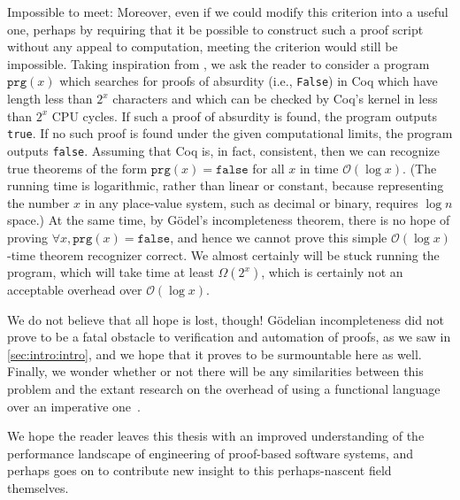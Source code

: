 Impossible to meet:
Moreover, even if we could modify this criterion into a useful one, perhaps by requiring that it be possible to construct such a proof script without any appeal to computation, meeting the criterion would still be impossible.
Taking inspiration from \textcite[pp.~24--25]{Logical2016Garrabrant}, we ask the reader to consider a program $\texttt{prg}(x)$ which searches for proofs of absurdity (i.e., \texttt{False}) in Coq which have length less than $2^x$ characters and which can be checked by Coq's kernel in less than $2^x$ CPU cycles.
If such a proof of absurdity is found, the program outputs \texttt{true}.
If no such proof is found under the given computational limits, the program outputs \texttt{false}.
Assuming that Coq is, in fact, consistent, then we can recognize true theorems of the form $\texttt{prg}(x) = \texttt{false}$ for all $x$ in time $\mathcal O(\log x)$.
(The running time is logarithmic, rather than linear or constant, because representing the number $x$ in any place-value system, such as decimal or binary, requires $\log n$ space.)
At the same time, by Gödel's incompleteness theorem, there is no hope of proving $\forall x, \texttt{prg}(x) = \texttt{false}$, and hence we cannot prove this simple $\mathcal O(\log x)$-time theorem recognizer correct.
We almost certainly will be stuck running the program, which will take time at least $\Omega(2^x)$, which is certainly not an acceptable overhead over $\mathcal O(\log x)$.

We do not believe that all hope is lost, though!
Gödelian incompleteness did not prove to be a fatal obstacle to verification and automation of proofs, as we saw in \autoref{sec:intro:intro}, and we hope that it proves to be surmountable here as well.
Finally, we wonder whether or not there will be any similarities between this problem and the extant research on the overhead of using a functional language over an imperative one~\cite{Efficiency2010Campbell,Ben-AmramG92,Ben-amram96noteson,More1997Bird,okasaki1996purely,okasaki1998purely,Pure1997Pippenger}.


We hope the reader leaves this thesis with an improved understanding of the performance landscape of engineering of proof-based software systems, and perhaps goes on to contribute new insight to this perhaps-nascent field themselves.
